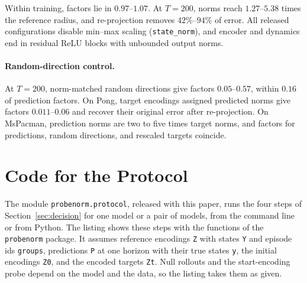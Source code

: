 Within training, factors lie in $0.97$--$1.07$. At $T=200$, norms reach $1.27$--$5.38$ times the reference radius, and re-projection removes $42$\%--$94$\% of error. All released configurations disable min--max scaling (\texttt{state\_norm}), and encoder and dynamics end in residual ReLU blocks with unbounded output norms.

\paragraph{Random-direction control.} At $T=200$, norm-matched random directions give factors $0.05$--$0.57$, within $0.16$ of prediction factors. On Pong, target encodings assigned predicted norms give factors $0.011$--$0.06$ and recover their original error after re-projection. On MsPacman, prediction norms are two to five times target norms, and factors for predictions, random directions, and rescaled targets coincide.

\section{Code for the Protocol}
\label{app:code}
The module \texttt{probenorm.protocol}, released with this paper, runs the four steps of Section~\ref{sec:decision} for one model or a pair of models, from the command line or from Python. The listing shows these steps with the functions of the \texttt{probenorm} package. It assumes reference encodings \texttt{Z} with states \texttt{Y} and episode ids \texttt{groups}, predictions \texttt{P} at one horizon with their true states \texttt{y}, the initial encodings \texttt{Z0}, and the encoded targets \texttt{Zt}. Null rollouts and the start-encoding probe depend on the model and the data, so the listing takes them as given.

